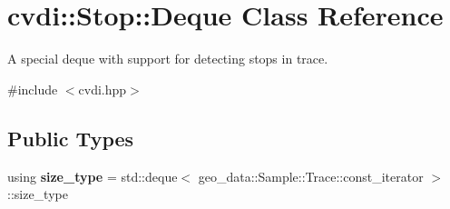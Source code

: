 \hypertarget{classcvdi_1_1Stop_1_1Deque}{}\section{cvdi\+:\+:Stop\+:\+:Deque Class Reference}
\label{classcvdi_1_1Stop_1_1Deque}


A special deque with support for detecting stops in trace.  




{\ttfamily \#include $<$cvdi.\+hpp$>$}

\subsection*{Public Types}
\begin{DoxyCompactItemize}
\item 
using {\bfseries size\+\_\+type} = std\+::deque$<$ geo\+\_\+data\+::\+Sample\+::\+Trace\+::const\+\_\+iterator $>$\+::size\+\_\+type\hypertarget{classcvdi_1_1Stop_1_1Deque_ab87d53f81657062dd9b54aa9b6ef5664}{}\label{classcvdi_1_1Stop_1_1Deque_ab87d53f81657062dd9b54aa9b6ef5664}

\end{DoxyCompactItemize}
